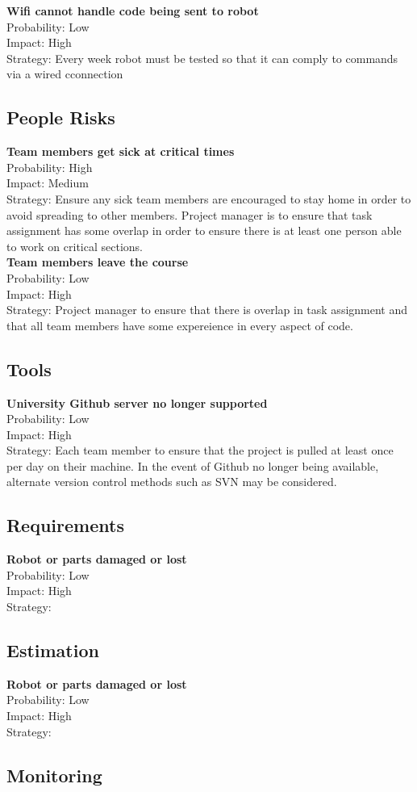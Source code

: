 \documentclass[11pt, a4paper]{article}
\begin{document}
			\textbf{Wifi cannot handle code being sent to robot}\\
			Probability: Low\\
			Impact: High\\
			Strategy: Every week robot must be tested so that it can comply to commands via a wired cconnection

			\subsection*{People Risks}
			\textbf{Team members get sick at critical times}\\
			Probability: High\\
			Impact: Medium\\
			Strategy: Ensure any sick team members are encouraged to stay home in order to avoid spreading to other members. Project manager is to ensure that task assignment has some overlap in order to ensure there is at least one person able to work on critical sections.\\
			
			\textbf{Team members leave the course}\\
			Probability: Low\\
			Impact: High\\
			Strategy: Project manager to ensure that there is overlap in task assignment and that all team members have some expereience in every aspect of code.

			\subsection*{Tools}
			\textbf{University Github server no longer supported}\\
			Probability: Low\\
			Impact: High\\
			Strategy: Each team member to ensure that the project is pulled at least once per day on their machine. In the event of Github no longer being available, alternate version control methods such as SVN may be considered.

			\subsection*{Requirements}
			\textbf{Robot or parts damaged or lost}\\
			Probability: Low\\
			Impact: High\\
			Strategy:
			\subsection*{Estimation}
			\textbf{Robot or parts damaged or lost}\\
			Probability: Low\\
			Impact: High\\
			Strategy:
		
		\subsection{Monitoring}
\end{document}
